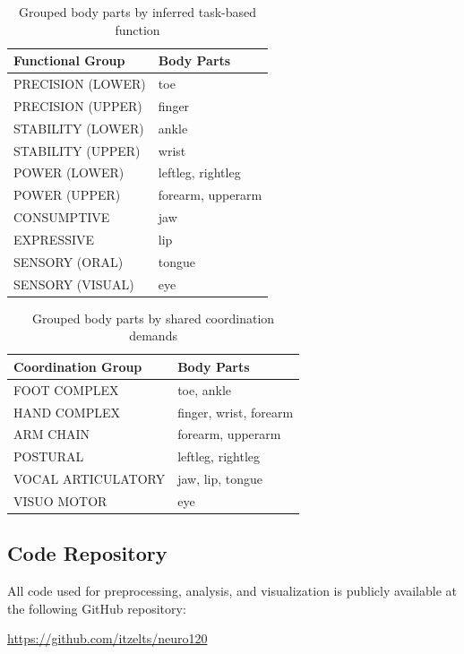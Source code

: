 \documentclass{article}
\begin{document}
\begin{table}[h]
\centering
\begin{tabular}{|l|l|}
\hline
\textbf{Functional Group} & \textbf{Body Parts} \\
\hline
PRECISION (LOWER) & toe \\
PRECISION (UPPER) & finger \\
STABILITY (LOWER)& ankle \\
STABILITY (UPPER) & wrist \\
POWER (LOWER) & leftleg, rightleg \\
POWER (UPPER) & forearm, upperarm \\
CONSUMPTIVE & jaw \\
EXPRESSIVE & lip \\
SENSORY (ORAL) & tongue \\
SENSORY (VISUAL) & eye \\
\hline
\end{tabular}
\caption{Grouped body parts by inferred task-based function}
\label{tab:grouped_task}
\end{table}

\begin{table}[h]
\centering
\begin{tabular}{|l|l|}
\hline
\textbf{Coordination Group} & \textbf{Body Parts} \\
\hline
FOOT COMPLEX & toe, ankle \\
HAND COMPLEX & finger, wrist, forearm \\
ARM CHAIN & forearm, upperarm \\
POSTURAL & leftleg, rightleg \\
VOCAL ARTICULATORY & jaw, lip, tongue \\
VISUO MOTOR & eye \\
\hline
\end{tabular}
\caption{Grouped body parts by shared coordination demands}
\label{tab:grouped_coord}
\end{table}

\newpage
\subsection*{Code Repository}
All code used for preprocessing, analysis, and visualization is publicly available at the following GitHub repository:

\begin{center}
\url{https://github.com/itzelts/neuro120}
\end{center}
\end{document}
